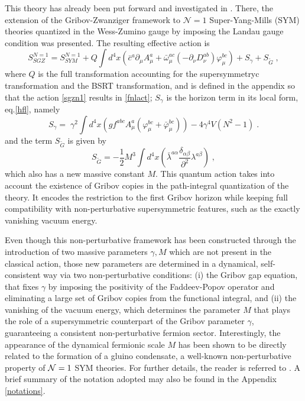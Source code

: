 This theory has already been put forward and investigated in \cite{Capri:2014xea}. There, the extension of the Gribov-Zwanziger framework to $\mathcal  N = 1$ 
Super-Yang-Mills (SYM) theories quantized in the Wess-Zumino gauge by imposing the Landau gauge condition was presented. The resulting 
effective action is
\begin{equation} 
S_{SGZ}^{N=1} = S_{SYM}^{N=1}  + Q \int d^4x \left( {\bar c}^a \partial_\mu A^a_\mu + {\bar \omega}^{ac}_{\mu}  (-\partial_\nu D^{ab}_{\nu} ) \varphi^{bc}_{\mu}  \right) +  S_{\gamma} + S_{\tilde{G}} \;, \label{sgzn1}
\end{equation} 
where $Q$ is the full transformation accounting for the supersymmetryc transformation and the
BSRT transformation, and is defined in the appendix so that the action \eqref{sgzn1} results in
\eqref{fnlact}; $S_{\gamma}$ is the horizon term in its local form, eq.\eqref{hfl}, namely 
\begin{equation}
S_\gamma =\; \gamma^{2} \int d^{4}x \left( gf^{abc}A^{a}_{\mu}(\varphi^{bc}_{\mu} + {\bar \varphi}^{bc}_{\mu})\right)-4 \gamma^4V (N^2-1)\;. \label{hfln1}
\end{equation} 
and the term $S_{\tilde{G}}$ is given by 
\begin{equation}
S_{\tilde{G}} = - \frac{1}{2}M^3\int d^{4}x \left( \bar{\lambda}^{a\alpha}\frac{\delta_{\alpha\beta}}{\partial^{2}}\lambda^{a\beta}\right) \;, \label{sslambda}
 \end{equation} 
which also has a new massive constant $M$. This quantum action takes into account the existence of Gribov copies in the path-integral quantization of the theory. It encodes the restriction to the first Gribov horizon while
keeping full compatibility with non-perturbative supersymmetric features, such as the exactly vanishing vacuum energy. 

Even though this non-perturbative framework has been constructed through the introduction of two massive parameters $\gamma, M$ which are not present in the classical action,
those new parameters are determined in a dynamical, self-consistent way via two
non-perturbative conditions: (i) the Gribov gap equation, that fixes $\gamma$ by imposing the
positivity of the Faddeev-Popov operator and eliminating a large set of Gribov copies from the
functional integral, and (ii) the vanishing of the vacuum energy, which determines the
parameter $M$ that plays the role of a supersymmetric counterpart of the Gribov parameter
$\gamma$, guaranteeing a consistent non-perturbative fermion sector. Interestingly, the
appearance of the dynamical fermionic scale $M$ has been shown to be directly related to the
formation of a gluino condensate, a well-known non-perturbative property of ${\cal N}=1$ SYM
theories. For further details, the reader is referred to \cite{Capri:2014xea}. A brief
summary of the notation adopted may also be found in the Appendix \ref{notations}.

